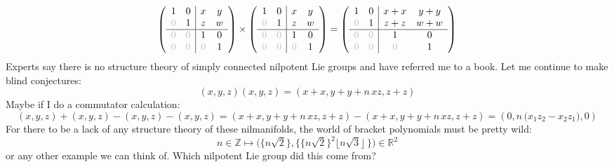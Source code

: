 \documentclass[12pt]{article}
\begin{document}
$$ \left( \begin{array}{cc|cc} 
1 & 0 & x & y \\ 
{\color{black!25!white}0} & 1 & z & w \\ \hline
{\color{black!25!white}0} & {\color{black!25!white}0} & 1 & 0 \\
{\color{black!25!white}0} & {\color{black!25!white}0} & {\color{black!25!white}0} & 1 \end{array} \right)
\times  \left( \begin{array}{cc|cc} 
1 & 0 & x & y \\ 
{\color{black!25!white}0} & 1 & z & w \\ \hline
{\color{black!25!white}0} & {\color{black!25!white}0} & 1 & 0 \\
{\color{black!25!white}0} & {\color{black!25!white}0} & {\color{black!25!white}0} & 1 \end{array} \right)
 =  \left( \begin{array}{cc|cc} 
1 & 0 & x + x& y + y \\ 
{\color{black!25!white}0} & 1 & z + z & w + w \\ \hline
{\color{black!25!white}0} & {\color{black!25!white}0} & 1 & 0 \\
{\color{black!25!white}0} & {\color{black!25!white}0} & {\color{black!25!white}0} & 1 \end{array} \right)  $$
Experts say there is no structure theory of simply connected nilpotent Lie groups and have referred me to a book.  Let me continue to make blind conjectures:
$$ (x,y,z)(x,y,z) = (x+x,  y+y+ n\, xz,z+z)$$
Maybe if I do a commutator calculation:
$$ (x,y,z) + (x,y,z) - (x,y,z) - (x,y,z) = (x+x,  y+y+ n\, xz,z+z) - (x+x,  y+y+ n\, xz,z+z) = (0, n \, \big( x_1 z_2 - x_2 z_1\big), 0) $$
For there to be a lack of any structure theory of these nilmanifolds, the world of bracket polynomials must be pretty wild:
$$ n \in \mathbb{Z} \mapsto \Big( \{ n \sqrt{2}\}, \big\{ \{ n \sqrt{2}\}^2 \lfloor n \sqrt{3}\rfloor \, \} \Big) \in \mathbb{R}^2 $$
or any other example we can think of.  Which nilpotent Lie group did this come from?
\newpage
\end{document}
